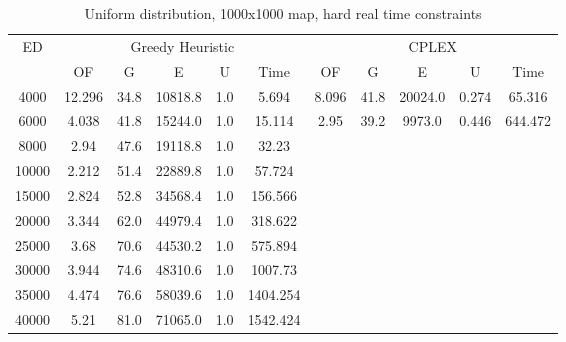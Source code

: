 \begin{table}[htb]
	\centering
	\begin{tabular}{|c|c|c|c|c|c|c|c|c|c|c|}
		\hline
		\multirow{2}{*}{ED} & \multicolumn{5}{c|}{Greedy Heuristic} & \multicolumn{5}{c|}{CPLEX}\\ 
		\cline{2-11}
& OF & G & E & U & Time & OF & G & E & U & Time\\ 
		\hline
		4000 & 12.296 & 34.8 & 10818.8 & 1.0 & 5.694 & 8.096 & 41.8 & 20024.0 & 0.274 & 65.316 \\ 
		6000 & 4.038 & 41.8 & 15244.0 & 1.0 & 15.114 & 2.95 & 39.2 & 9973.0 & 0.446 & 644.472 \\ 
		8000 & 2.94 & 47.6 & 19118.8 & 1.0 & 32.23 & & & & &  \\ 
		10000 & 2.212 & 51.4 & 22889.8 & 1.0 & 57.724 & & & & &  \\ 
		15000 & 2.824 & 52.8 & 34568.4 & 1.0 & 156.566 & & & & &  \\ 
		20000 & 3.344 & 62.0 & 44979.4 & 1.0 & 318.622 & & & & &  \\ 
		25000 & 3.68 & 70.6 & 44530.2 & 1.0 & 575.894 & & & & &  \\ 
		30000 & 3.944 & 74.6 & 48310.6 & 1.0 & 1007.73 & & & & &  \\ 
		35000 & 4.474 & 76.6 & 58039.6 & 1.0 & 1404.254 & & & & &  \\ 
		40000 & 5.21 & 81.0 & 71065.0 & 1.0 & 1542.424 & & & & &  \\ 
		\hline 
	\end{tabular} 
	\caption{Uniform distribution, 1000x1000 map, hard real time constraints} 
	\label{tab:unif_hard_n_esc_1000} 
\end{table} 

